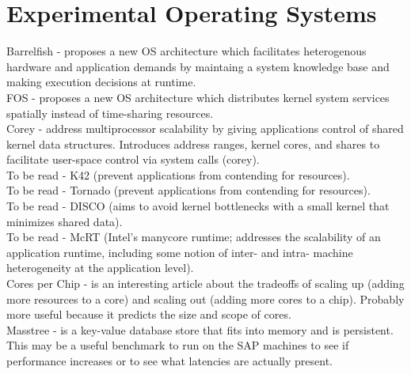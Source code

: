 \documentclass{article}
\begin{document}
\section{Experimental Operating Systems}

\noindent\cite{scheupback:manycore2008-barrelfish} Barrelfish - proposes a new OS architecture which facilitates heterogenous hardware and application demands by maintaing a system knowledge base and making execution decisions at runtime.\\

\noindent\cite{wentzlaff:acm2009-fos} FOS - proposes a new OS architecture which distributes kernel system services spatially instead of time-sharing resources.\\

\noindent\cite{boyd-wickizer:osdi2008-corey} Corey - address multiprocessor scalability by giving applications control of shared kernel data structures. Introduces address ranges, kernel cores, and shares to facilitate user-space control via system calls (corey).\\

\noindent\cite{appavoo:acm2007-k42} To be read - K42 (prevent applications from contending for resources).\\

\noindent\cite{gamsa:osdi1999-tornado} To be read - Tornado (prevent applications from contending for resources).\\

\noindent\cite{bugnion:acm1997-disco} To be read - DISCO (aims to avoid kernel bottlenecks with a small kernel that minimizes shared data).\\

\noindent\cite{saha:eurosys2007-cmp}  To be read - McRT (Intel's manycore runtime; addresses the scalability of an application runtime, including some notion of inter- and intra- machine heterogeneity at the application level).\\

\noindent\cite{agarwal:dac2007-killmulticore} Cores per Chip - is an interesting article about the tradeoffs of scaling up (adding more resources to a core) and scaling out (adding more cores to a chip). Probably more useful because it predicts the size and scope of cores.\\

\noindent\cite{mao:eurosys2012-masstree} Masstree - is a key-value database store that fits into memory and is persistent. This may be a useful benchmark to run on the SAP machines to see if performance increases or to see what latencies are actually present.\\
\end{document}
